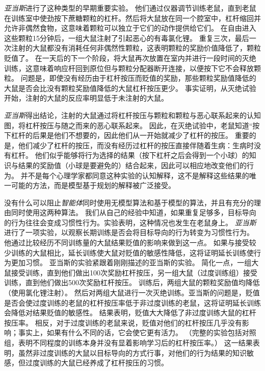 {{{\textit{亚当斯}\cite{adams1981instrumental}进行了这种类型的早期重要实验。
他们通过仪器调节训练老鼠，直到老鼠在训练室中使劲按下蔗糖颗粒的杠杆。然后将大鼠放在同一个腔室中，杠杆缩回并允许非偶然食物，这意味着颗粒可以独立于它们的动作提供给它们。
在自由进入这些颗粒15分钟后，一组大鼠注射了引起恶心的有毒氯化锂。
重复三次，最后一次注射的大鼠都没有消耗任何非偶然性颗粒，这表明颗粒的奖励价值降低了，颗粒贬值了。
在一天后的下一个阶段，将大鼠再次放置在室内并进行一段时间的灭绝训练，这意味着响应杆回到原位但与颗粒分配器断开连接，以便按下它不会释放颗粒。
问题是，即使没有经历由于杠杆按压而贬值的奖励，那些颗粒奖励值降低的大鼠是否会比没有颗粒奖励值降低的大鼠杠杆按压更少。
事实证明，从灭绝试验开始，注射的大鼠的反应率明显低于未注射的大鼠。


\textit{亚当斯}得出结论，注射的大鼠通过将杠杆按压与颗粒和颗粒与恶心联系起来的认知图，将杠杆按压与随之而来的恶心联系起来。
因此，在灭绝试验中，老鼠知道“按下杠杆的后果是他们不想要的，因此他们从一开始就减少了杠杆的按压。
重要的是，他们减少了杠杆的按压，而没有经历过杠杆的按压直接伴随着生病：生病时没有杠杆。
他们似乎能够将行为选择的结果（按下杠杆之后会得到一个小球）的知识与结果的奖励值（小球是要避免的）结合起来，因此可以相应地改变他们的行为。
并不是每个心理学家都同意这种实验的认知解释，这不是解释这些结果的唯一可能的方法，而是模型基于规划的解释被广泛接受。


没有什么可以阻止\textit{智能体}同时使用无模型算法和基于模型的算法，并且有充分的理由同时使用这两种算法。
我们从自己的经验中知道，如果重复足够多，目标导向的行为往往会变成习惯性行为。实验表明，这种情况也发生在老鼠身上。
\textit{亚当斯}\cite{adams1982variations}进行了一项实验，以观察长期训练是否会将目标导向的行为转变为习惯性行为。
他通过比较经历不同训练量的大鼠结果贬值的影响来做到这一点。
如果与接受较少训练的大鼠相比，延长训练使大鼠对贬值的敏感性降低，这将证明延长训练使行为更加习惯。
亚当斯的实验紧跟着刚刚描述的亚当斯\cite{adams1981instrumental}的实验。
简化一点，一组大鼠接受训练，直到他们做出100次奖励杠杆按压，另一组大鼠（过度训练组）接受训练，直到他们做出500次奖励杠杆按压。
训练后，两组大鼠的颗粒奖励值均降低（使用氯化锂注射）。
然后对两组大鼠进行一次灭绝训练。亚当斯的问题是，贬值是否会使过度训练的老鼠的杠杆按压率低于非过度训练的老鼠，这将证明延长训练会降低对结果贬值的敏感性。
结果表明，贬值大大降低了非过度训练大鼠的杠杆按压率。
相反，对于过度训练的老鼠来说，贬值对他们的杠杆按压几乎没有影响；事实上，如果有什么不同的话，它会使它更有活力。
（完整的实验包括对照组，表明不同程度的训练本身并没有显着影响学习后的杠杆按压率。）
这一结果表明，虽然非过度训练的大鼠以目标导向的方式行事，对他们的行为结果的知识敏感，但过度训练的大鼠已经养成了杠杆按压的习惯。



}}}
